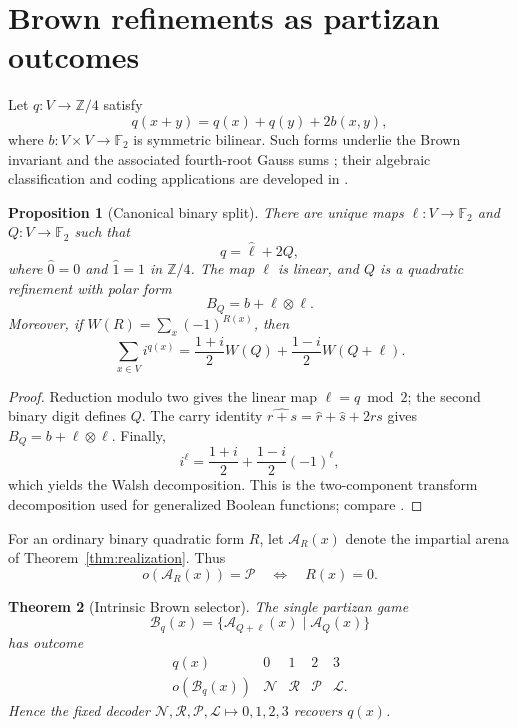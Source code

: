 \documentclass[11pt]{article}
\newtheorem{theorem}{Theorem}[section]
\newtheorem{proposition}[theorem]{Proposition}
\theoremstyle{definition}
\theoremstyle{remark}
\newcommand{\F}{\mathbb{F}}
\begin{document}
\section{Brown refinements as partizan outcomes}\label{sec:brown}

Let $q:V\to\mathbb Z/4$ satisfy
\[
 q(x+y)=q(x)+q(y)+2b(x,y),
\]
where $b:V\times V\to\F_2$ is symmetric bilinear.  Such forms underlie the
Brown invariant and the associated fourth-root Gauss sums
\cite{brown1972,brumfielmorgan1973}; their algebraic classification and coding
applications are developed in \cite{wood1993,schmidt2009}.

\begin{proposition}[Canonical binary split]\label{prop:brown-split}
There are unique maps $\ell:V\to\F_2$ and $Q:V\to\F_2$ such that
\[
  q=\widehat\ell+2Q,
\]
where $\widehat0=0$ and $\widehat1=1$ in $\mathbb Z/4$.  The map $\ell$ is
linear, and $Q$ is a quadratic refinement with polar form
\[
  B_Q=b+\ell\otimes\ell.
\]
Moreover, if $W(R)=\sum_x(-1)^{R(x)}$, then
\[
 \sum_{x\in V}i^{q(x)}
 =\frac{1+i}{2}W(Q)+\frac{1-i}{2}W(Q+\ell).
\]
\end{proposition}

\begin{proof}
Reduction modulo two gives the linear map $\ell=q\bmod2$; the second binary
digit defines $Q$.  The carry identity
$\widehat{r+s}=\widehat r+\widehat s+2rs$ gives
$B_Q=b+\ell\otimes\ell$.  Finally,
\[
 i^{\ell}=\frac{1+i}{2}+\frac{1-i}{2}(-1)^\ell,
\]
which yields the Walsh decomposition.  This is the two-component transform
decomposition used for generalized Boolean functions; compare
\cite[Lemma~17]{stanicamartinsengangopadhyaysingh2013}.
\end{proof}

For an ordinary binary quadratic form $R$, let $\mathcal A_R(x)$ denote the
impartial arena of Theorem~\ref{thm:realization}.  Thus
\[
 o(\mathcal A_R(x))=\mathcal P
 \quad\Longleftrightarrow\quad R(x)=0.
\]

\begin{theorem}[Intrinsic Brown selector]\label{thm:brown-selector}
The single partizan game
\[
 \mathcal B_q(x)=
 \{\mathcal A_{Q+\ell}(x)\mid\mathcal A_Q(x)\}
\]
has outcome
\[
\begin{array}{c|cccc}
q(x)&0&1&2&3\\ \hline
o(\mathcal B_q(x))&\mathcal N&\mathcal R&\mathcal P&\mathcal L.
\end{array}
\]
Hence the fixed decoder
$\mathcal N,\mathcal R,\mathcal P,\mathcal L\mapsto0,1,2,3$ recovers
$q(x)$.
\end{theorem}
\end{document}
